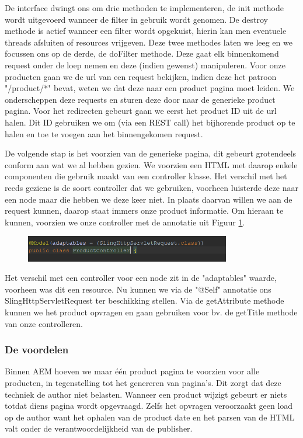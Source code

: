 \documentclass{article}
\begin{document}
    De interface dwingt ons om drie methoden te implementeren, de init methode wordt uitgevoerd wanneer de filter in gebruik wordt genomen. De destroy methode is actief wanneer een filter wordt opgekuist, hierin kan men eventuele threads afsluiten of resources vrijgeven. Deze twee methodes laten we leeg en we focussen ons op de derde, de doFilter methode. Deze gaat elk binnenkomend request onder de loep nemen en deze (indien gewenst) manipuleren. Voor onze producten gaan we de url van een request bekijken, indien deze het patroon "/product/*" bevat, weten we dat deze naar een product pagina moet leiden. We onderscheppen deze requests en sturen deze door naar de generieke product pagina. Voor het redirecten gebeurt gaan we eerst het product ID uit de url halen. Dit ID gebruiken we om (via een REST call) het bijhorende product op te halen en toe te voegen aan het binnengekomen request.
    \par
    De volgende stap is het voorzien van de generieke pagina, dit gebeurt grotendeels conform aan wat we al hebben gezien. We voorzien een HTML met daarop enkele componenten die gebruik maakt van een controller klasse. Het verschil met het reeds geziene is de soort controller dat we gebruiken, voorheen luisterde deze naar een node maar die hebben we deze keer niet. In plaats daarvan willen we aan de request kunnen, daarop staat immers onze product informatie. Om hieraan te kunnen, voorzien we onze controller met de annotatie uit Figuur \ref{fig:request-controller}.

    \begin{figure}[h!]
  		\includegraphics[width=0.8\textwidth]{images/request-controller.PNG}
  		\label{fig:request-controller}
	\end{figure}
    
    Het verschil met een controller voor een node zit in de "adaptables" waarde, voorheen was dit een resource. Nu kunnen we via de "@Self" annotatie ons SlingHttpServletRequest ter beschikking stellen. Via de getAttribute methode kunnen we het product opvragen en gaan gebruiken voor bv. de getTitle methode van onze controlleren. 
	\subsubsection{De voordelen}
    Binnen AEM hoeven we maar \'e\'en product pagina te voorzien voor alle producten, in tegenstelling tot het genereren van pagina's. Dit zorgt dat deze techniek de author niet belasten. Wanneer een product wijzigt gebeurt er niets totdat diens pagina wordt opgevraagd. Zelfs het opvragen veroorzaakt geen load op de author want het ophalen van de product date en het parsen van de HTML valt onder de verantwoordelijkheid van de publisher.
\end{document}
